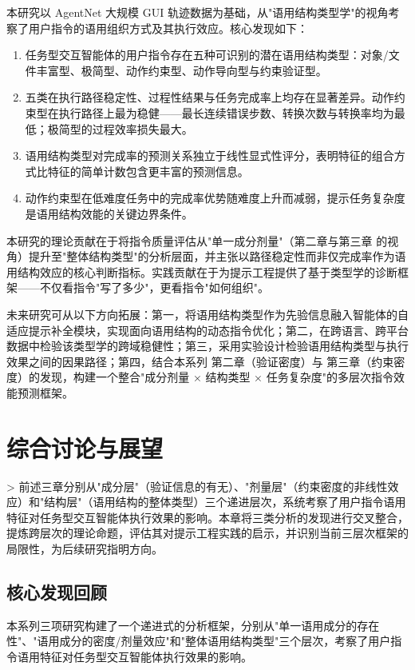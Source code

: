 \documentclass[12pt,a4paper,openany,oneside]{ctexrep}
\begin{document}
本研究以 AgentNet 大规模 GUI 轨迹数据为基础，从"语用结构类型学"的视角考察了用户指令的语用组织方式及其执行效应。核心发现如下：

\begin{enumerate}
\item[1.] 任务型交互智能体的用户指令存在五种可识别的潜在语用结构类型：对象/文件丰富型、极简型、动作约束型、动作导向型与约束验证型。
\item[2.] 五类在执行路径稳定性、过程性结果与任务完成率上均存在显著差异。动作约束型在执行路径上最为稳健——最长连续错误步数、转换次数与转换率均为最低；极简型的过程效率损失最大。
\item[3.] 语用结构类型对完成率的预测关系独立于线性显式性评分，表明特征的组合方式比特征的简单计数包含更丰富的预测信息。
\item[4.] 动作约束型在低难度任务中的完成率优势随难度上升而减弱，提示任务复杂度是语用结构效能的关键边界条件。
\end{enumerate}


本研究的理论贡献在于将指令质量评估从"单一成分剂量"（第二章与第三章 的视角）提升至"整体结构类型"的分析层面，并主张以路径稳定性而非仅完成率作为语用结构效应的核心判断指标。实践贡献在于为提示工程提供了基于类型学的诊断框架——不仅看指令"写了多少"，更看指令"如何组织"。

未来研究可从以下方向拓展：第一，将语用结构类型作为先验信息融入智能体的自适应提示补全模块，实现面向语用结构的动态指令优化；第二，在跨语言、跨平台数据中检验该类型学的跨域稳健性；第三，采用实验设计检验语用结构类型与执行效果之间的因果路径；第四，结合本系列 第二章（验证密度）与 第三章（约束密度）的发现，构建一个整合"成分剂量 × 结构类型 × 任务复杂度"的多层次指令效能预测框架。
\newpage

\chapter{综合讨论与展望}


> 前述三章分别从"成分层"（验证信息的有无）、"剂量层"（约束密度的非线性效应）和"结构层"（语用结构的整体类型）三个递进层次，系统考察了用户指令语用特征对任务型交互智能体执行效果的影响。本章将三类分析的发现进行交叉整合，提炼跨层次的理论命题，评估其对提示工程实践的启示，并识别当前三层次框架的局限性，为后续研究指明方向。


\section{核心发现回顾}


本系列三项研究构建了一个递进式的分析框架，分别从"单一语用成分的存在性"、"语用成分的密度/剂量效应"和"整体语用结构类型"三个层次，考察了用户指令语用特征对任务型交互智能体执行效果的影响。
\end{document}
